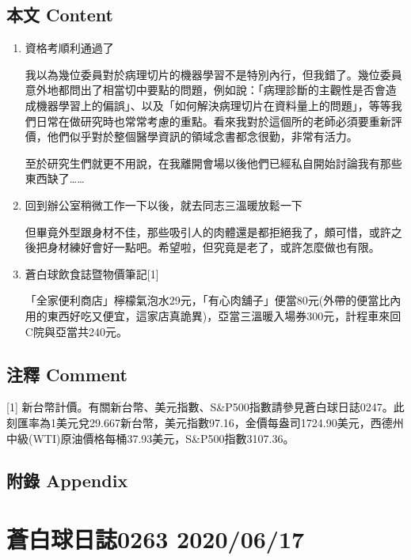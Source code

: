 \documentclass[a5paper, 11pt
]{book}
\begin{document}
\hypertarget{ux672cux6587-content-13}{%
\subsection{本文 Content}\label{ux672cux6587-content-13}}

\begin{enumerate}
\def\labelenumi{\arabic{enumi}.}
\item
  資格考順利通過了

  我以為幾位委員對於病理切片的機器學習不是特別內行，但我錯了。幾位委員意外地都問出了相當切中要點的問題，例如說：「病理診斷的主觀性是否會造成機器學習上的偏誤」、以及「如何解決病理切片在資料量上的問題」，等等我們日常在做研究時也常常考慮的重點。看來我對於這個所的老師必須要重新評價，他們似乎對於整個醫學資訊的領域念書都念很勤，非常有活力。

  至於研究生們就更不用說，在我離開會場以後他們已經私自開始討論我有那些東西缺了\ldots\ldots{}
\item
  回到辦公室稍微工作一下以後，就去同志三溫暖放鬆一下

  但畢竟外型跟身材不佳，那些吸引人的肉體還是都拒絕我了，頗可惜，或許之後把身材練好會好一點吧。希望啦，但究竟是老了，或許怎麼做也有限。
\item
  蒼白球飲食誌暨物價筆記{[}1{]}

  「全家便利商店」檸檬氣泡水29元，「有心肉舖子」便當80元(外帶的便當比內用的東西好吃又便宜，這家店真詭異)，亞當三溫暖入場券300元，計程車來回C院與亞當共240元。
\end{enumerate}

\hypertarget{ux6ce8ux91cb-comment-13}{%
\subsection{注釋 Comment}\label{ux6ce8ux91cb-comment-13}}

{[}1{]}
新台幣計價。有關新台幣、美元指數、S\&P500指數請參見蒼白球日誌0247。此刻匯率為1美元兌29.667新台幣，美元指數97.16，金價每盎司1724.90美元，西德州中級(WTI)原油價格每桶37.93美元，S\&P500指數3107.36。

\hypertarget{ux9644ux9304-appendix-13}{%
\subsection{附錄 Appendix}\label{ux9644ux9304-appendix-13}}

\hypertarget{ux84bcux767dux7403ux65e5ux8a8c0263-20200617}{%
\section{蒼白球日誌0263
2020/06/17}\label{ux84bcux767dux7403ux65e5ux8a8c0263-20200617}}
\end{document}
